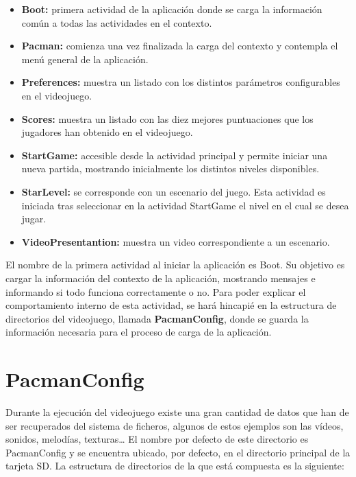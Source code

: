 \begin{itemize}
\item \textbf{Boot:} primera actividad de la aplicación donde se carga la información común a todas las actividades en el contexto.
\item \textbf{Pacman:} comienza una vez finalizada la carga del contexto y contempla el menú general de la aplicación.
\item \textbf{Preferences:} muestra un listado con los distintos parámetros configurables en el videojuego.
\item \textbf{Scores:} muestra un listado con las diez mejores puntuaciones que los jugadores han obtenido en el videojuego.
\item \textbf{StartGame:} accesible desde la actividad principal y permite iniciar una nueva partida, mostrando inicialmente los distintos niveles disponibles.
\item \textbf{StarLevel:} se corresponde con un escenario del juego. Esta actividad es iniciada tras seleccionar en la actividad StartGame el nivel en el cual se desea jugar.
\item \textbf{VideoPresentantion:} muestra un video correspondiente a un escenario.
\end{itemize}

El nombre de la primera actividad al iniciar la aplicación es Boot. Su objetivo es cargar la información del contexto de la aplicación, mostrando mensajes e informando si todo funciona correctamente o no. Para poder explicar el comportamiento interno de esta actividad, se hará hincapié en la estructura de directorios del videojuego, llamada  \textbf{PacmanConfig},  donde se guarda la información necesaria para el proceso de carga de la aplicación.

\section{PacmanConfig}

Durante la ejecución del videojuego existe una gran cantidad de datos que han de ser recuperados del sistema de ficheros, algunos de estos ejemplos son las vídeos, sonidos, melodías,  texturas\ldots
El nombre por defecto de este directorio es PacmanConfig y se encuentra ubicado, por defecto, en el directorio principal de la tarjeta SD. La estructura de directorios de la que está compuesta es la siguiente:

